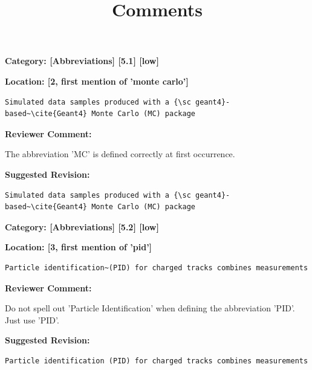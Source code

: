 \documentclass[12pt]{article}
\title{Comments}
\begin{document}
	\maketitle

\begin{reviewer}
\noindent \textbf{Category: [Abbreviations] [5.1] [low]}

\noindent \textbf{Location: [2, first mention of 'monte carlo']}

\begin{lstlisting}[breaklines=true]
	Simulated data samples produced with a {\sc geant4}-based~\cite{Geant4} Monte Carlo (MC) package
\end{lstlisting}

\textbf{Reviewer Comment:}

The abbreviation 'MC' is defined correctly at first occurrence.

\textbf{Suggested Revision:}

\begin{lstlisting}[breaklines=true]
	Simulated data samples produced with a {\sc geant4}-based~\cite{Geant4} Monte Carlo (MC) package
\end{lstlisting}

\end{reviewer}

\begin{reviewer}
\noindent \textbf{Category: [Abbreviations] [5.2] [low]}

\noindent \textbf{Location: [3, first mention of 'pid']}

\begin{lstlisting}[breaklines=true]
	Particle identification~(PID) for charged tracks combines measurements
\end{lstlisting}

\textbf{Reviewer Comment:}

Do not spell out 'Particle Identification' when defining the abbreviation 'PID'. Just use 'PID'.

\textbf{Suggested Revision:}

\begin{lstlisting}[breaklines=true]
	Particle identification (PID) for charged tracks combines measurements
\end{lstlisting}

\end{reviewer}
\end{document}
